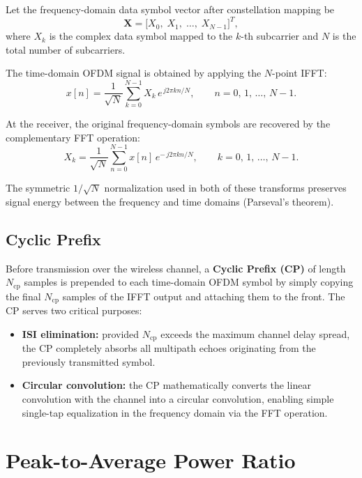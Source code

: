 Let the frequency-domain data symbol vector after constellation mapping be
\begin{equation*}
    \bm{X} = \bigl[X_0,\; X_1,\; \dots,\; X_{N-1}\bigr]^T,
\end{equation*}
where $X_k$ is the complex data symbol mapped to the $k$-th subcarrier and $N$ is the total number of subcarriers.

The time-domain OFDM signal is obtained by applying the $N$-point IFFT:
\begin{equation*}
    x[n] = \frac{1}{\sqrt{N}} \sum_{k=0}^{N-1} X_k \, e^{\,j2\pi kn/N},
    \qquad n = 0,\, 1,\, \dots,\, N-1.
\end{equation*}

At the receiver, the original frequency-domain symbols are recovered by the complementary FFT operation:
\begin{equation*}
    X_k = \frac{1}{\sqrt{N}} \sum_{n=0}^{N-1} x[n] \, e^{-\,j2\pi kn/N},
    \qquad k = 0,\, 1,\, \dots,\, N-1.
\end{equation*}

The symmetric $1/\!\sqrt{N}$ normalization used in both of these transforms preserves signal energy between the frequency and time domains (Parseval's theorem).

\subsection{Cyclic Prefix}

Before transmission over the wireless channel, a \textbf{Cyclic Prefix (CP)} of length $N_{\mathrm{cp}}$ samples is prepended to each time-domain OFDM symbol by simply copying the final $N_{\mathrm{cp}}$ samples of the IFFT output and attaching them to the front. The CP serves two critical purposes:
\begin{itemize}
    \item \textbf{ISI elimination:} provided $N_{\mathrm{cp}}$ exceeds the maximum channel delay spread, the CP completely absorbs all multipath echoes originating from the previously transmitted symbol.
    \item \textbf{Circular convolution:} the CP mathematically converts the linear convolution with the channel into a circular convolution, enabling simple single-tap equalization in the frequency domain via the FFT operation.
\end{itemize}

\section{Peak-to-Average Power Ratio}
\label{sec:papr}

